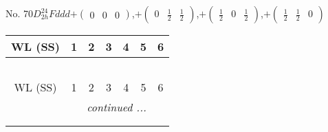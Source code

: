 \documentclass[fleqn,9pt,landscape]{jsarticle}
\begin{document}
\newpage
No. 70\quad$D_{2h}^{24}$\quad$Fddd$\quad[ orthorhombic ]\quad$+\begin{pmatrix} 0 & 0 & 0 \end{pmatrix}$,\quad $+\begin{pmatrix} 0 & \frac{1}{2} & \frac{1}{2} \end{pmatrix}$,\quad $+\begin{pmatrix} \frac{1}{2} & 0 & \frac{1}{2} \end{pmatrix}$,\quad $+\begin{pmatrix} \frac{1}{2} & \frac{1}{2} & 0 \end{pmatrix}$
\begin{center}
\renewcommand{\arraystretch}{1.2}
\begin{longtable}{ccccccc}
 \hline \hline
WL (SS) & 1 & 2 & 3 & 4 & 5 & 6 \\ \hline \endfirsthead

\multicolumn{6}{l}{\tablename\ \thetable{}} \\
 \hline \hline
WL (SS) & 1 & 2 & 3 & 4 & 5 & 6 \\ \hline \endhead

 \hline \hline
\multicolumn{6}{r}{\footnotesize\it continued ...} \\ \endfoot

 \hline \hline
\multicolumn{6}{r}{} \\ \endlastfoot


\end{longtable}
\end{center}
\end{document}
